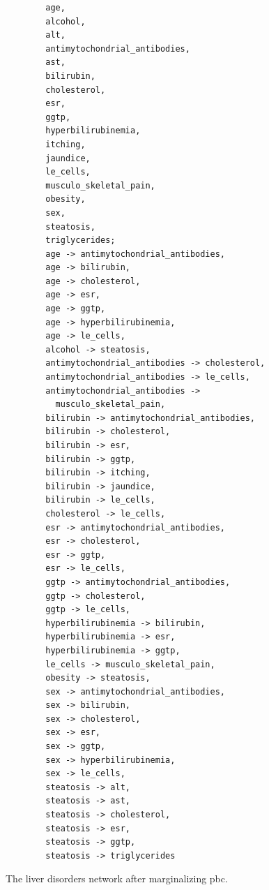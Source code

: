 \documentclass{article}
\begin{document}
	\begin{figure}
	\begin{verbatim}
		age,
		alcohol,
		alt,
		antimytochondrial_antibodies,
		ast,
		bilirubin,
		cholesterol,
		esr,
		ggtp,
		hyperbilirubinemia,
		itching,
		jaundice,
		le_cells,
		musculo_skeletal_pain,
		obesity,
		sex,
		steatosis,
		triglycerides;
		age -> antimytochondrial_antibodies,
		age -> bilirubin,
		age -> cholesterol,
		age -> esr,
		age -> ggtp,
		age -> hyperbilirubinemia,
		age -> le_cells,
		alcohol -> steatosis,
		antimytochondrial_antibodies -> cholesterol,
		antimytochondrial_antibodies -> le_cells,
		antimytochondrial_antibodies ->
		  musculo_skeletal_pain,
		bilirubin -> antimytochondrial_antibodies,
		bilirubin -> cholesterol,
		bilirubin -> esr,
		bilirubin -> ggtp,
		bilirubin -> itching,
		bilirubin -> jaundice,
		bilirubin -> le_cells,
		cholesterol -> le_cells,
		esr -> antimytochondrial_antibodies,
		esr -> cholesterol,
		esr -> ggtp,
		esr -> le_cells,
		ggtp -> antimytochondrial_antibodies,
		ggtp -> cholesterol,
		ggtp -> le_cells,
		hyperbilirubinemia -> bilirubin,
		hyperbilirubinemia -> esr,
		hyperbilirubinemia -> ggtp,
		le_cells -> musculo_skeletal_pain,
		obesity -> steatosis,
		sex -> antimytochondrial_antibodies,
		sex -> bilirubin,
		sex -> cholesterol,
		sex -> esr,
		sex -> ggtp,
		sex -> hyperbilirubinemia,
		sex -> le_cells,
		steatosis -> alt,
		steatosis -> ast,
		steatosis -> cholesterol,
		steatosis -> esr,
		steatosis -> ggtp,
		steatosis -> triglycerides
	\end{verbatim}
	\caption{The liver disorders network after marginalizing pbc.}
	\label{marginalized}
	\end{figure}
\end{document}
